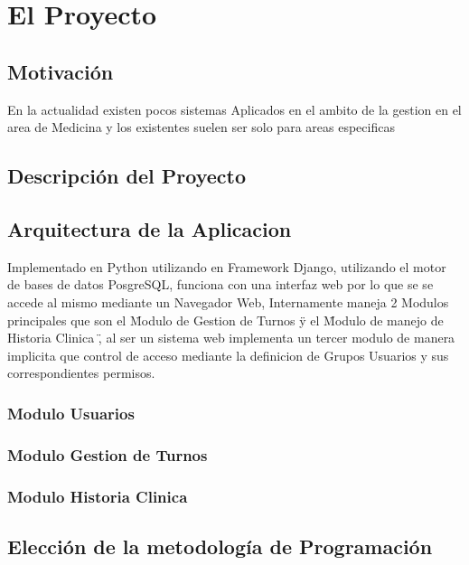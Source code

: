 \chapter{El Proyecto}

\section{Motivación}

En la actualidad existen pocos sistemas Aplicados en el ambito de la gestion en
el area de Medicina y los existentes suelen ser solo para areas especificas

\section{Descripción del Proyecto}



\section{Arquitectura de la Aplicacion}

Implementado en Python utilizando en Framework Django, utilizando el motor de bases
de datos PosgreSQL, funciona con una interfaz web por lo que se se accede al
mismo mediante un Navegador Web, Internamente maneja 2 Modulos principales
que son el  \" Modulo de Gestion de Turnos \" y el \" Modulo de manejo de
Historia Clinica \" , al ser un sistema web implementa un tercer modulo de manera
implicita que control de acceso mediante la definicion de Grupos Usuarios y
sus correspondientes permisos.

\subsection{Modulo Usuarios}




\subsection{Modulo Gestion de Turnos}

\subsection{Modulo Historia Clinica}

\section{Elección de la metodología de Programación}

